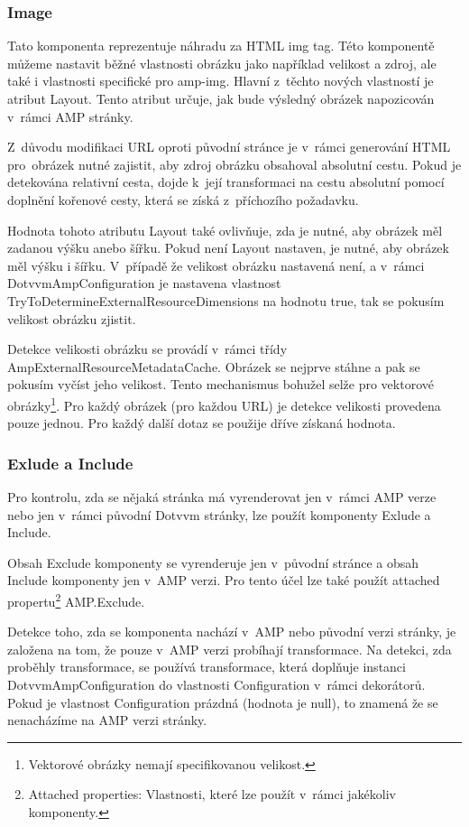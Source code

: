  \subsubsection{Image}
 Tato komponenta reprezentuje náhradu za HTML img tag. Této komponentě můžeme nastavit běžné vlastnosti obrázku jako například velikost a zdroj, ale také i vlastnosti specifické pro amp-img. Hlavní z~těchto nových vlastností je atribut Layout. Tento atribut určuje, jak bude výsledný obrázek napozicován v~rámci AMP stránky.
 
 Z~důvodu modifikaci URL oproti původní stránce je v~rámci generování HTML pro~obrázek nutné zajistit, aby zdroj obrázku obsahoval absolutní cestu. Pokud je detekována relativní cesta, dojde k~její transformaci na cestu absolutní pomocí doplnění kořenové cesty, která se získá z~příchozího požadavku.
 
 Hodnota tohoto atributu Layout také ovlivňuje, zda je nutné, aby obrázek měl zadanou výšku anebo šířku. Pokud není Layout nastaven, je nutné, aby obrázek měl výšku i šířku. V~případě že velikost obrázku nastavená není, a v~rámci DotvvmAmpConfiguration je nastavena vlastnost TryToDetermineExternalResourceDimensions na hodnotu true, tak se pokusím velikost obrázku zjistit.
 
 Detekce velikosti obrázku se provádí v~rámci třídy AmpExternalResourceMetadataCache. Obrázek se nejprve stáhne a pak se pokusím vyčíst jeho velikost. Tento mechanismus bohužel selže pro vektorové obrázky\footnote{Vektorové obrázky nemají specifikovanou velikost.}. Pro každý obrázek (pro každou URL) je detekce velikosti provedena pouze jednou. Pro každý další dotaz se použije dříve získaná hodnota.
 
 \subsubsection{Exlude a Include}
 Pro kontrolu, zda se nějaká stránka má vyrenderovat jen v~rámci AMP verze nebo jen v~rámci původní Dotvvm stránky, lze použít komponenty Exlude a Include.
 
 Obsah Exclude komponenty se vyrenderuje jen v~původní stránce a obsah Include komponenty jen v~AMP verzi. Pro tento účel lze také použít attached propertu\footnote{Attached properties: Vlastnosti, které lze použít v~rámci jakékoliv komponenty.} AMP.Exclude.
 
 Detekce toho, zda se komponenta nachází v~AMP nebo původní verzi stránky, je založena na tom, že pouze v~AMP verzi probíhají transformace. Na detekci, zda proběhly transformace, se používá transformace, která doplňuje instanci DotvvmAmpConfiguration do vlastnosti Configuration v~rámci dekorátorů. Pokud je vlastnost Configuration prázdná (hodnota je null), to znamená že se nenacházíme na AMP verzi stránky.
 
